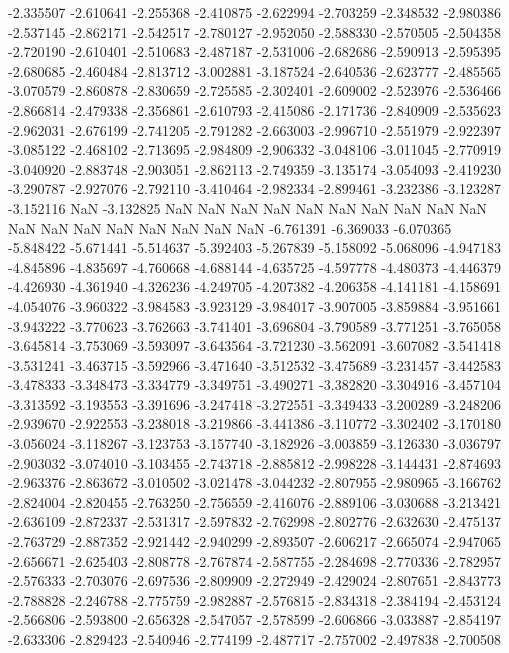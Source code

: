 -2.335507
-2.610641
-2.255368
-2.410875
-2.622994
-2.703259
-2.348532
-2.980386
-2.537145
-2.862171
-2.542517
-2.780127
-2.952050
-2.588330
-2.570505
-2.504358
-2.720190
-2.610401
-2.510683
-2.487187
-2.531006
-2.682686
-2.590913
-2.595395
-2.680685
-2.460484
-2.813712
-3.002881
-3.187524
-2.640536
-2.623777
-2.485565
-3.070579
-2.860878
-2.830659
-2.725585
-2.302401
-2.609002
-2.523976
-2.536466
-2.866814
-2.479338
-2.356861
-2.610793
-2.415086
-2.171736
-2.840909
-2.535623
-2.962031
-2.676199
-2.741205
-2.791282
-2.663003
-2.996710
-2.551979
-2.922397
-3.085122
-2.468102
-2.713695
-2.984809
-2.906332
-3.048106
-3.011045
-2.770919
-3.040920
-2.883748
-2.903051
-2.862113
-2.749359
-3.135174
-3.054093
-2.419230
-3.290787
-2.927076
-2.792110
-3.410464
-2.982334
-2.899461
-3.232386
-3.123287
-3.152116
NaN
-3.132825
NaN
NaN
NaN
NaN
NaN
NaN
NaN
NaN
NaN
NaN
NaN
NaN
NaN
NaN
NaN
NaN
NaN
NaN
-6.761391
-6.369033
-6.070365
-5.848422
-5.671441
-5.514637
-5.392403
-5.267839
-5.158092
-5.068096
-4.947183
-4.845896
-4.835697
-4.760668
-4.688144
-4.635725
-4.597778
-4.480373
-4.446379
-4.426930
-4.361940
-4.326236
-4.249705
-4.207382
-4.206358
-4.141181
-4.158691
-4.054076
-3.960322
-3.984583
-3.923129
-3.984017
-3.907005
-3.859884
-3.951661
-3.943222
-3.770623
-3.762663
-3.741401
-3.696804
-3.790589
-3.771251
-3.765058
-3.645814
-3.753069
-3.593097
-3.643564
-3.721230
-3.562091
-3.607082
-3.541418
-3.531241
-3.463715
-3.592966
-3.471640
-3.512532
-3.475689
-3.231457
-3.442583
-3.478333
-3.348473
-3.334779
-3.349751
-3.490271
-3.382820
-3.304916
-3.457104
-3.313592
-3.193553
-3.391696
-3.247418
-3.272551
-3.349433
-3.200289
-3.248206
-2.939670
-2.922553
-3.238018
-3.219866
-3.441386
-3.110772
-3.302402
-3.170180
-3.056024
-3.118267
-3.123753
-3.157740
-3.182926
-3.003859
-3.126330
-3.036797
-2.903032
-3.074010
-3.103455
-2.743718
-2.885812
-2.998228
-3.144431
-2.874693
-2.963376
-2.863672
-3.010502
-3.021478
-3.044232
-2.807955
-2.980965
-3.166762
-2.824004
-2.820455
-2.763250
-2.756559
-2.416076
-2.889106
-3.030688
-3.213421
-2.636109
-2.872337
-2.531317
-2.597832
-2.762998
-2.802776
-2.632630
-2.475137
-2.763729
-2.887352
-2.921442
-2.940299
-2.893507
-2.606217
-2.665074
-2.947065
-2.656671
-2.625403
-2.808778
-2.767874
-2.587755
-2.284698
-2.770336
-2.782957
-2.576333
-2.703076
-2.697536
-2.809909
-2.272949
-2.429024
-2.807651
-2.843773
-2.788828
-2.246788
-2.775759
-2.982887
-2.576815
-2.834318
-2.384194
-2.453124
-2.566806
-2.593800
-2.656328
-2.547057
-2.578599
-2.606866
-3.033887
-2.854197
-2.633306
-2.829423
-2.540946
-2.774199
-2.487717
-2.757002
-2.497838
-2.700508
